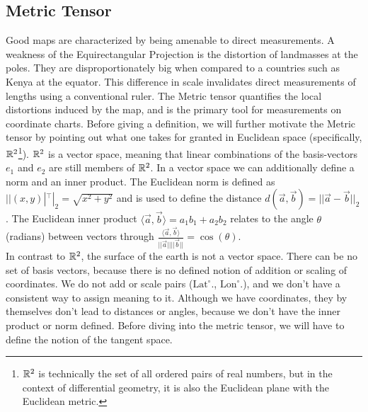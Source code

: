 \subsection*{Metric Tensor}
Good maps are characterized by being amenable to direct measurements. A weakness of the Equirectangular Projection is the distortion of landmasses at the poles. They are disproportionately big when compared to a countries such as Kenya at the equator. This difference in scale invalidates direct measurements of lengths using a conventional ruler. The Metric tensor quantifies the local distortions induced by the map, and is the primary tool for measurements on coordinate charts.
Before giving a definition, we will further motivate the Metric tensor by pointing out what one takes for granted in Euclidean space (specifically, $\mathbb{R}^2$\footnote{$\mathbb{R}^2$ is technically the set of all ordered pairs of real numbers, but in the context of differential geometry, it is also the Euclidean plane with the Euclidean metric.}). $\mathbb{R}^2$ is a vector space, meaning that linear combinations of the basis-vectors $e_1$ and $e_2$ are still members of $\mathbb{R}^2$. In a vector space we can additionally define a norm and an inner product. The Euclidean norm is defined as $||(x,y)|^\top|_2 = \sqrt{x^2 + y^2}$ and is used to define the distance $d(\vec{a}, \vec{b}) = ||\vec{a}-\vec{b}||_2$. The Euclidean inner product $\langle \vec{a},\vec{b} \rangle = a_1b_1 +a_2b_2$ relates to the angle $\theta$ (radians) between vectors through $\frac{\langle \vec{a},\vec{b} \rangle}{||\vec{a}||||\vec{b}||} = \cos(\theta)$.
\\
In contrast to $\mathbb{R}^2$, the surface of the earth is not a vector space. There can be no set of basis vectors, because there is no defined notion of addition or scaling of coordinates. We do not add or scale pairs ($\text{Lat}^\circ$., $\text{Lon}^\circ$.), and we don't have a consistent way to assign meaning to it. Although we have coordinates, they by themselves don't lead to distances or angles, because we don't have the inner product or norm defined. Before diving into the metric tensor, we will have to define the notion of the tangent space.

